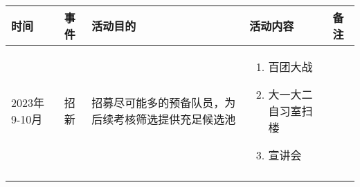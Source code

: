 \begin{longtable}{ X | X | X | X | X }

    \hline

    \endfoot
    
    \rowcolor{tabhdcolor}
    
        时间 &
        事件 &
        活动目的 &
        活动内容 &
        备注 \\
        
    \hline
    
    \endhead
    
        2023年9-10月&
        招新&
        招募尽可能多的预备队员，为后续考核筛选提供充足候选池&
        \begin{enumerate}
        
            \item 百团大战
        
            \item 大一大二自习室扫楼
        
            \item 宣讲会
            
        \end{enumerate} &
        \\
    
    \hline
    
        &
        &
        &
        &
        \\
    
    \hline
    
\end{longtable}